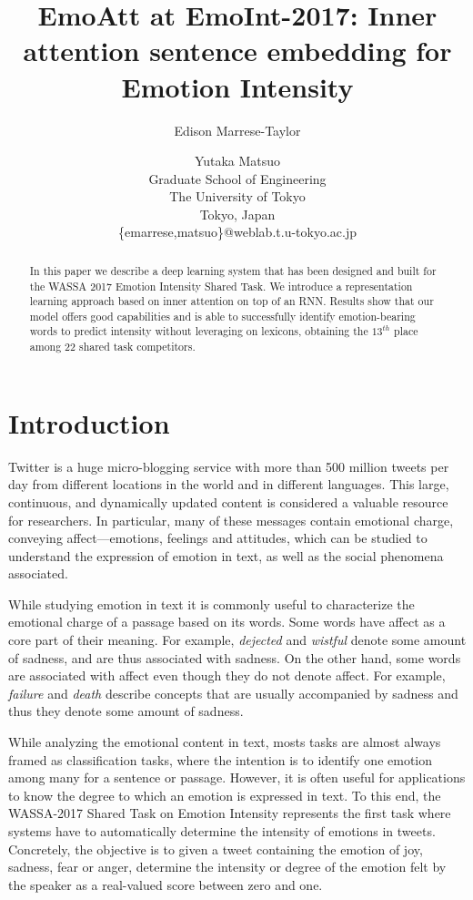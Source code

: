 \documentclass[11pt,letterpaper]{article}
\title{EmoAtt at EmoInt-2017: Inner attention sentence embedding for Emotion Intensity}
\author{Edison Marrese-Taylor \and Yutaka Matsuo\\
		Graduate School of Engineering \\
		The University of Tokyo \\
		Tokyo, Japan \\
		 {\{emarrese,matsuo\}@weblab.t.u-tokyo.ac.jp}}
\date{}
\begin{document}
\maketitle

\begin{abstract}
	In this paper we describe a deep learning system that has been designed and built for the WASSA 2017 Emotion Intensity Shared Task. We introduce a representation learning approach based on inner attention on top of an RNN. Results show that our model offers good capabilities and is able to successfully identify emotion-bearing words to predict intensity without leveraging on lexicons, obtaining the $13^{th}$ place among 22 shared task competitors. 
\end{abstract}


\section{Introduction}

Twitter is a huge micro-blogging service with more than 500 million tweets per day from different locations in the world and in different languages. This large, continuous, and dynamically updated content is considered a valuable resource for researchers. In particular, many of these messages contain emotional charge, conveying affect—emotions, feelings and attitudes, which can be studied to understand the expression of emotion in text, as well as the social phenomena associated.

While studying emotion in text it is commonly useful to characterize the emotional charge of a passage based on its words. Some words have affect as a core part of their meaning. For example, \textit{dejected} and \textit{wistful} denote some amount of sadness, and are thus associated with sadness. On the other hand, some words are associated with affect even though they do not denote affect. For example, \textit{failure} and \textit{death} describe concepts that are usually accompanied by sadness and thus they denote some amount of sadness.

While analyzing the emotional content in text, mosts tasks are almost always framed as classification tasks, where the intention is to identify one emotion among many for a sentence or passage. However, it is often useful for applications to know the degree to which an emotion is expressed in text. To this end, the WASSA-2017 Shared Task on Emotion Intensity \cite{wassa_emoint_2017} represents the first task where systems have to automatically determine the intensity of emotions in tweets. Concretely, the objective is to given a tweet containing the emotion of joy, sadness, fear or anger, determine the intensity or degree of the emotion felt by the speaker as a real-valued score between zero and one. 
\end{document}

